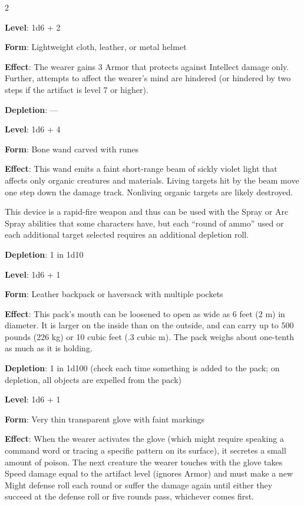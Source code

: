 \begin{multicols}{2}

\textbf{Level}: 1d6 + 2 

\textbf{Form}: Lightweight cloth, leather, or metal helmet 

\textbf{Effect}: The wearer gains 3 Armor that protects against Intellect damage only. Further, attempts to affect the wearer’s mind are hindered (or hindered by two steps if the artifact is level 7 or higher). 

\textbf{Depletion}: — 


\textbf{Level}: 1d6 + 4 

\textbf{Form}: Bone wand carved with runes 

\textbf{Effect}: This wand emits a faint short-range beam of sickly violet light that affects only organic creatures and materials. Living targets hit by the beam move one step down the damage track. Nonliving organic targets are likely destroyed. 

This device is a rapid-fire weapon and thus can be used with the Spray or Arc Spray abilities that some characters have, but each “round of ammo” used or each additional target selected requires an additional depletion roll. 

\textbf{Depletion}: 1 in 1d10


\textbf{Level}: 1d6 + 1 

\textbf{Form}: Leather backpack or haversack with multiple pockets

\textbf{Effect}: This pack’s mouth can be loosened to open as wide as 6 feet (2 m) in diameter. It is larger on the inside than on the outside, and can carry up to 500 pounds (226 kg) or 10 cubic feet (.3 cubic m). The pack weighs about one-tenth as much as it is holding. 

\textbf{Depletion}: 1 in 1d100 (check each time something is added to the pack; on depletion, all objects are expelled from the pack) 


\textbf{Level}: 1d6 + 1 

\textbf{Form}: Very thin transparent glove with faint markings

\textbf{Effect}: When the wearer activates the glove (which might require speaking a command word or tracing a specific pattern on its surface), it secretes a small amount of poison. The next creature the wearer touches with the glove takes Speed damage equal to the artifact level (ignores Armor) and must make a new Might defense roll each round or suffer the damage again until either they succeed at the defense roll or five rounds pass, whichever comes first. 


\end{multicols}
